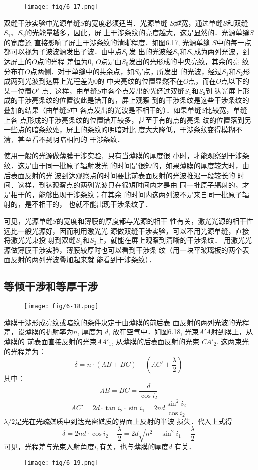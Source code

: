 \begin{figure}[htp]
    \centering
     \texttt{[image: fig/6-17.png]}
    \caption{}
\end{figure}

双缝干涉实验中光源单缝$S$的宽度必须适当．光源单缝
$S$越宽，通过单缝$S$和双缝$S_1$、$S_2$的光能量越多，因此，屏
上干涉条纹的亮度越大，这是显然的．光源单缝$S$的宽度还
直接影响了屏上干涉条纹的清晰程度．如图6.17, 光源单缝
$S$中的每一点都可以视为子波波源发出子波．由中点$S_0$发
出的光波经$S_1$和$S_2$成为两列光波，到达屏上的$O$点的光程
差恒为0, $O$点是由$S_0$发出的光形成的中央亮纹，其余的亮
纹分布在$O$点两侧．对于单缝中的共余点，如$S_0'$点，所发出
的光波，经过$S_1$和$S_2$形成两列光波到达屏上光程差为0的
中央亮纹的位置显然不在$O$点，而在$O$点以下的某一位置$O'$
点．这样，由单缝$S$中各个点发出的光经过双缝$S_1$和$S_2$到
达光屏上形成的干涉亮条纹的位置彼此是错开的，屏上观察
到的干涉条纹是这些干涉条纹的叠加的结果（由单缝$S$中
各点发出的光波是不相干的）．如果单缝$S$比较宽，单缝上各
点形成的干涉亮条纹的位置错开较多，甚至于有的点的亮条
纹的位置落到另一些点的暗条纹处，屏上的条纹的明暗对比
度大大降低，干涉条纹变得模糊不清，甚至看不到明暗相间的
干涉条纹．

使用一般的光源做薄膜干涉实验，只有当薄膜的厚度很
小时，才能观察到干涉条纹．这是由于同一批原子辐射发光
的时间是很短的，如果薄膜的厚度较大时，由后表面反射的光
波到达观察点的时间要比前表面反射的光波推迟一段较长的
时间．这样，到达观察点的两列光波只在很短时间内才是由
同一批原子辐射的，才是相干的，能够出现干涉条纹；在其余
的时间内这两列波不是来自同一批原子辐射的，是不相干的，
也就不能出现干涉条纹了．

可见，光源单缝$S$的宽度和薄膜的厚度都与光源的相干
性有关，激光光源的相干性远比一般光源好，因而利用激光光
源做双缝干涉实验，可以不用光源单缝，直接将激光光束投
射到双缝$S_1$和$S_2$上，就能在屏上观察到清晰的干涉条纹．
用激光光源做薄膜干涉实验，薄膜较厚时也可以看到干涉条
纹（用一块平玻璃板的两个表面反射的两列光波叠加起来就
能看到干涉条纹）．

\subsection{等倾干涉和等厚干涉}

\begin{figure}[htp]
    \centering
     \texttt{[image: fig/6-18.png]}
    \caption{}
\end{figure}

薄膜干涉形成亮纹或暗纹的条件决定于由薄膜的前后表
面反射的两列光波的光程差，设薄膜的折射率为$n$, 厚度为
$d$, 放在空气中．如图6.18, 光束$A'A$射到膜上，从薄膜的
前表面直接反射的光束$AA'_1$, 从薄膜的后表面反射的光束
$CA'_2$. 这两束光的光程差为：
\[\delta =n\cdot (AB+BC)-\left(AC'+\frac{\lambda}{2}\right)\]
其中：
\[AB=BC=\frac{d}{\cos i_2}\]
\[AC'=2d\cdot \tan i_2\cdot \sin i_1=2nd \frac{\sin^2 i_2}{\cos i_2}\]
$\lambda/2$是光在光疏媒质中到达光密媒质的界面上反射的半波
损失．代入上式得
\[\delta=2nd\cdot \cos i_2-\frac{\lambda}{2}=2d\sqrt{n^2-\sin^2 i_1}-\frac{\lambda}{2}\]
可见，光程差与光束入射角度$i_1$有关，也与薄膜的厚度$d$
有关．
\begin{figure}[htp]
    \centering
     \texttt{[image: fig/6-19.png]}
    \caption{}
\end{figure}

